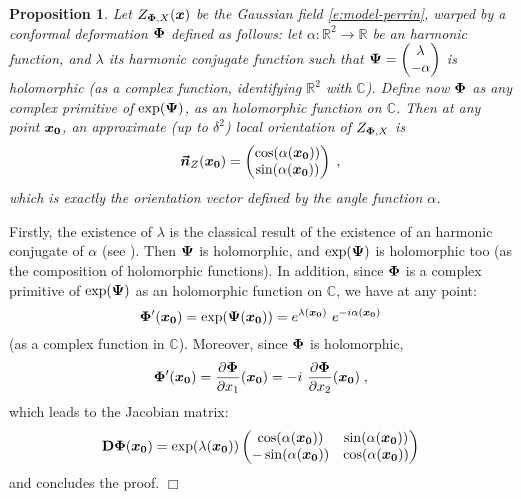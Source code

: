 \documentclass{elsarticle}
\newtheorem{proposition}{Proposition}
\newenvironment{proof}{\medskip\noindent{\bf Proof.}\;}{\null\hfill $\Box$\par\medskip }
\def\R{\mbox{$\mathbb{R}$}}
\def\C{\mbox{$\mathbb{C}$}}
\begin{document}
\begin{proposition}\label{cor:harmonic}
Let $Z_{\mathbf{\Phi},X}(\bm{x})$ be the Gaussian field \eqref{e:model-perrin}, warped by a conformal deformation $\mathbf{\Phi}$ defined as follows:
let $\alpha: \mathbb{R}^2 \to \R$ be an harmonic function, and $\lambda$ its harmonic conjugate function such that $\mathbf{\Psi}=\begin{pmatrix}\lambda\\-\alpha\end{pmatrix}$ is holomorphic (as a complex function, identifying $\R^2$ with $\C$). Define now  $\mathbf{\Phi}$ as any complex primitive of $\exp(\mathbf{\Psi})$, as an holomorphic function on $\mathbb{C}$. Then at any point $\bm{x_0}$, an approximate (up to $\delta^2$) local orientation of $Z_{\mathbf{\Phi},X}$ is 
\[
\bm{\vec n}_Z(\bm{x_0})=\begin{pmatrix}\cos(\alpha(\bm{x_0}))\\ \sin(\alpha(\bm{x_0}))\end{pmatrix}\;,
\]
which is exactly the orientation vector defined by the angle function $\alpha$.
\end{proposition}
\begin{proof}
Firstly, the existence of $\lambda$ is the classical result of the existence of an harmonic conjugate of $\alpha$ (see \cite{Stein70}). Then $\mathbf{\Psi}$ is holomorphic, and  $\exp(\mathbf{\Psi})$ is holomorphic too (as the composition of holomorphic functions). In addition, since $\mathbf{\Phi}$ is a complex primitive of $\exp(\mathbf{\Psi})$ as an holomorphic function on $\mathbb{C}$, we have at any point:
\[
\mathbf{\Phi}'(\bm{x_0})=\exp(\mathbf{\Psi}(\bm{x_0}))=e^{\lambda (\bm{x_0})}~e^{-i \alpha(\bm{x_0})}
\]
(as a complex function in $\C$).
Moreover, since $\mathbf{\Phi}$ is holomorphic, 
\[
\mathbf{\Phi}'(\bm{x_0}) = \frac{\partial \mathbf{\Phi}}{\partial x_1}(\bm{x_0})=-i ~\frac{\partial \mathbf{\Phi}}{\partial x_2}(\bm{x_0})\;,
\]
which leads to the Jacobian matrix:
\[
\mathbf{D}\mathbf{\Phi}(\bm{x_0})=\exp(\lambda(\bm{x_0}))\begin{pmatrix}\cos(\alpha(\bm{x_0}))&\sin(\alpha(\bm{x_0}))\\ -\sin(\alpha(\bm{x_0}))&\cos(\alpha(\bm{x_0}))\end{pmatrix}
\]
and concludes the proof.
\end{proof}

\end{document}
